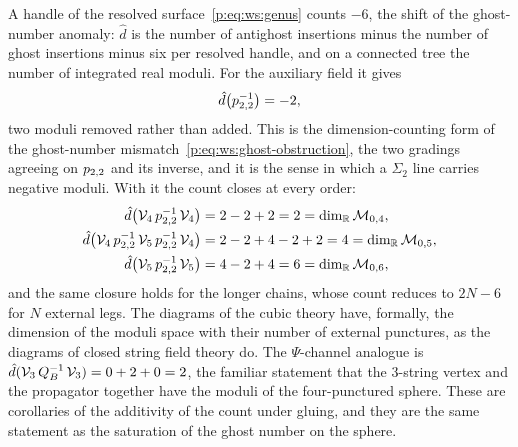 A handle of the resolved surface~\eqref{p:eq:ws:genus} counts $- 6$, the shift of the ghost-number anomaly: $\hat d$ is the number of antighost insertions minus the number of ghost insertions minus six per resolved handle, and on a connected tree the number of integrated real moduli.
For the auxiliary field it gives
\begin{equation}
  \label{p:eq:ws:negative-moduli}
  \hat d\big( p_{2,2}^{-1} \big)
    = - 2,
\end{equation}
two moduli removed rather than added.
This is the dimension-counting form of the ghost-number mismatch~\eqref{p:eq:ws:ghost-obstruction}, the two gradings agreeing on $p_{2,2}$ and its inverse, and it is the sense in which a $\Sigma_2$ line carries negative moduli.
With it the count closes at every order:
\begin{equation}
  \label{p:eq:ws:closure}
  \begin{aligned}
    \hat d\big( \mathcal{V}_{4} \, p_{2,2}^{-1} \, \mathcal{V}_{4} \big)
      &
      = 2 - 2 + 2
      = 2
      = \dim_{\mathbb{R}} \mathcal M_{0,4},
    \\
    \hat d\big( \mathcal{V}_{4} \, p_{2,2}^{-1} \, \mathcal{V}_{5} \, p_{2,2}^{-1} \, \mathcal{V}_{4} \big)
      &
      = 2 - 2 + 4 - 2 + 2
      = 4
      = \dim_{\mathbb{R}} \mathcal M_{0,5},
    \\
    \hat d\big( \mathcal{V}_{5} \, p_{2,2}^{-1} \, \mathcal{V}_{5} \big)
      &
      = 4 - 2 + 4
      = 6
      = \dim_{\mathbb{R}} \mathcal M_{0,6},
  \end{aligned}
\end{equation}
and the same closure holds for the longer chains, whose count reduces to $2 N - 6$ for $N$ external legs.
The diagrams of the cubic theory have, formally, the dimension of the moduli space with their number of external punctures, as the diagrams of closed string field theory do.
The $\Psi$-channel analogue is $\hat d(\mathcal{V}_{3} \, Q_B^{-1} \, \mathcal{V}_{3}) = 0 + 2 + 0 = 2$, the familiar statement that the $3$-string vertex and the propagator together have the moduli of the four-punctured sphere.
These are corollaries of the additivity of the count under gluing, and they are the same statement as the saturation of the ghost number on the sphere.

